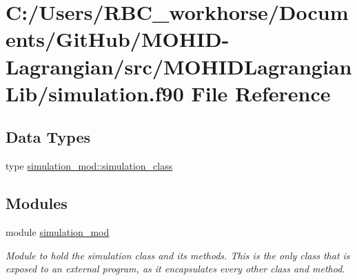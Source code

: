 \hypertarget{simulation_8f90}{}\section{C\+:/\+Users/\+R\+B\+C\+\_\+workhorse/\+Documents/\+Git\+Hub/\+M\+O\+H\+I\+D-\/\+Lagrangian/src/\+M\+O\+H\+I\+D\+Lagrangian\+Lib/simulation.f90 File Reference}
\label{simulation_8f90}
\subsection*{Data Types}
\begin{DoxyCompactItemize}
\item 
type \mbox{\hyperlink{structsimulation__mod_1_1simulation__class}{simulation\+\_\+mod\+::simulation\+\_\+class}}
\end{DoxyCompactItemize}
\subsection*{Modules}
\begin{DoxyCompactItemize}
\item 
module \mbox{\hyperlink{namespacesimulation__mod}{simulation\+\_\+mod}}
\begin{DoxyCompactList}\small\item\em Module to hold the simulation class and its methods. This is the only class that is exposed to an external program, as it encapsulates every other class and method. \end{DoxyCompactList}\end{DoxyCompactItemize}

